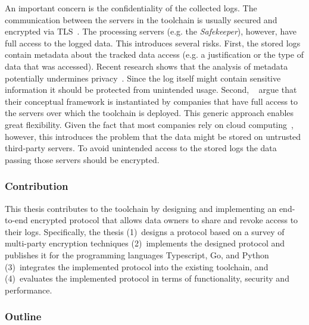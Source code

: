 \documentclass[../main.tex]{subfiles}
\begin{document}
An important concern is the confidentiality of the collected logs.
The communication between the servers in the toolchain is usually secured and encrypted via TLS~\cite{Rescorla2000}.
The processing servers (e.g. the \emph{Safekeeper}), however, have full access to the logged data.
This introduces several risks.
First, the stored logs contain metadata about the tracked data access (e.g. a justification or the type of data that was accessed).
Recent research shows that the analysis of metadata potentially undermines privacy~\cite{Greschbach2012,Mayer2016}.
Since the log itself might contain sensitive information it should be protected from unintended usage.
Second, \citeauthor{Zieglmeier2021}~\cite{Zieglmeier2021} argue that their conceptual framework is instantiated by companies that have full access to the servers over which the toolchain is deployed.
This generic approach enables great flexibility.
Given the fact that most companies rely on cloud computing~\cite{Weber2021}, however, this introduces the problem that the data might be stored on untrusted third-party servers.
To avoid unintended access to the stored logs the data passing those servers should be encrypted.

\subsubsection{Contribution}

This thesis contributes to the toolchain by designing and implementing an end-to-end encrypted protocol that allows data owners to share and revoke access to their logs.
Specifically, the thesis 
(1)~designs a protocol based on a survey of multi-party encryption techniques
(2)~implements the designed protocol and publishes it for the programming languages Typescript, Go, and Python
(3)~integrates the implemented protocol into the existing toolchain, and 
(4)~evaluates the implemented protocol in terms of functionality, security and performance.

\subsubsection{Outline}
\end{document}
